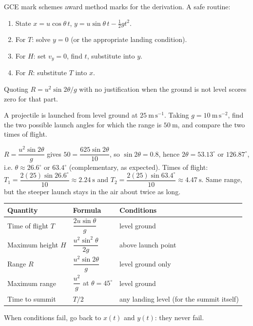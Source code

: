 \documentclass[11pt]{article}
\begin{document}
\begin{methode}
GCE mark schemes award method marks for the derivation. A safe routine:
\begin{enumerate}
\item State $x=u\cos\theta\,t$, $y=u\sin\theta\,t-\tfrac12 gt^{2}$.
\item For $T$: solve $y=0$ (or the appropriate landing condition).
\item For $H$: set $v_y=0$, find $t$, substitute into $y$.
\item For $R$: substitute $T$ into $x$.
\end{enumerate}
Quoting $R=u^{2}\sin 2\theta/g$ with no justification when the ground is not level scores zero for that part.
\end{methode}

\begin{exercice}[]
A projectile is launched from level ground at $25\ \mathrm{m\,s^{-1}}$. Taking $g=10\ \mathrm{m\,s^{-2}}$, find the two possible launch angles for which the range is $50\ \mathrm{m}$, and compare the two times of flight.
\end{exercice}

\begin{corrige}[Exercise 1]
$R=\dfrac{u^{2}\sin 2\theta}{g}$ gives $50=\dfrac{625\sin 2\theta}{10}$, so $\sin 2\theta=0.8$, hence $2\theta=53.13^{\circ}$ or $126.87^{\circ}$, i.e. $\theta\approx 26.6^{\circ}$ or $63.4^{\circ}$ (complementary, as expected). Times of flight: $T_1=\dfrac{2(25)\sin 26.6^{\circ}}{10}\approx 2.24\ \mathrm{s}$ and $T_2=\dfrac{2(25)\sin 63.4^{\circ}}{10}\approx 4.47\ \mathrm{s}$. Same range, but the steeper launch stays in the air about twice as long.
\end{corrige}

\begin{aretenir}
\begin{center}
\begin{tabularx}{\linewidth}{|l|X|X|}
\hline
\rowcolor{popblueL} Quantity & Formula & Conditions \\
\hline
Time of flight $T$ & $\dfrac{2u\sin\theta}{g}$ & level ground \\
\hline
Maximum height $H$ & $\dfrac{u^{2}\sin^{2}\theta}{2g}$ & above launch point \\
\hline
Range $R$ & $\dfrac{u^{2}\sin 2\theta}{g}$ & level ground only \\
\hline
Maximum range & $\dfrac{u^{2}}{g}$ at $\theta=45^{\circ}$ & level ground \\
\hline
Time to summit & $T/2$ & any landing level (for the summit itself) \\
\hline
\end{tabularx}
\end{center}
When conditions fail, go back to $x(t)$ and $y(t)$: they never fail.
\end{aretenir}
\end{document}
